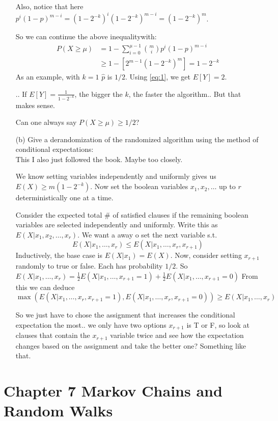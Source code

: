 \documentclass[10pt]{article}
\newcounter{set}
\begin{document}
\begin{enumerate}
Also, notice that here $p^i(1-p)^{m-i} = (1-2^{-k})^i(1-2^{-k})^{m-i}
= (1-2^{-k})^m$.

So we can continue the above inequalitywith:
\begin{align*}
  P(X\ge \mu) &= 1 - \sum_{i=0}^{\mu-1}{m \choose i}p^i(1-p)^{m-i}\\
  &\ge 1 -[ 2^{m-1} (1-2^{-k})^m] = 1-2^{-k}
\end{align*}
As an example, with $k=1$ $\hat{p}$ is  $1/2$.
Using \ref{eq:1}, we get $E[Y] = 2$.

.. If $E[Y] = \frac{1}{1-2^{-k}}$, the bigger the $k$, the
faster the algorithm.. But that makes sense.

Can one always say $P(X\ge \mu) \ge 1/2$?

\item[(b)] Give a derandomization of the randomized algorithm using
  the method of conditional expectations:\\
This I also just followed the book. Maybe too closely. 

We know setting variables independently and uniformly gives us $E(X)
\ge m(1-2^{-k})$. Now set the boolean variables $x_1, x_2, \dots$  up
to $r$ deterministically one at a time.

Consider the expected total \# of satisfied clauses if the remaining
boolean variables are selected independently and uniformly. Write this
as $E(X|x_1, x_2, \dots, x_r)$. We want a away o set the next variable
s.t.
\begin{equation}
  \label{eq:2}E(X|x_1, \dots, x_r) \le E(X|x_1, \dots, x_r, x_{r+1})  
\end{equation}
Inductively, the base case is $E(X|x_1) = E(X)$. Now, consider setting
$x_{r+1}$ randomly to true or false. Each has probability $1/2$. So
$E(X|x_1,\dots,x_r) = \frac{1}{2}E(X|x_1,\dots,x_{r+1} = 1) +
\frac{1}{2}E(X|x_1,\dots, x_{r+1} = 0)$
From this we can deduce $$\max(E(X|x_1,\dots,x_r,x_{r+1} = 1),
E(X|x_1,\dots,x_r,x_{r+1} = 0)) \ge E(X|x_1,\dots, x_r)$$ 

So we just have to chose the assignment that increases the
conditional expectation the most.. we only have two options $x_{r+1}$
is T or F, so look at clauses that contain the $x_{r+1}$ variable
twice and see how the expectation changes based on the assignment and
take the better one? Something like that.

\end{enumerate}

\section{Chapter 7 Markov Chains and Random Walks}
\label{sec:chap7}
\end{document}
